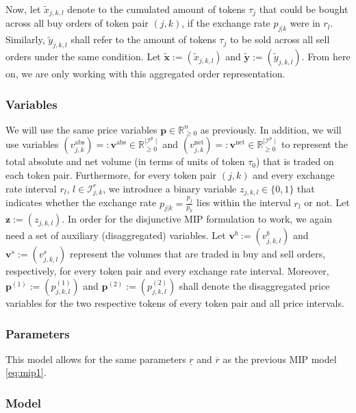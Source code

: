 \documentclass[11pt,parskip=full]{scrartcl}%
\newcommand*{\itokenpairs}{\mathcal{I}^p}   %
\begin{document}
Now, let $ \tilde{x}_{j,k,l} $ denote to the cumulated amount of tokens $ \tau_j $ that could be
bought across all buy orders of token pair $ (j,k) $, if the exchange rate $ p_{j|k} $ were in
$ r_l $.
Similarly, $ \tilde{y}_{j,k,l} $ shall refer to the amount of tokens $ \tau_j $ to be sold across
all sell orders under the same condition.
Let $ \tilde{\mathbf{x}} := (\tilde{x}_{j,k,l}) $ and
$ \tilde{\mathbf{y}} := (\tilde{y}_{j,k,l}) $.
From here on, we are only working with this aggregated order representation.


\subsubsection*{Variables}

We will use the same price variables $ \mathbf{p} \in \mathbb{R}^n_{\ge 0} $ as previously.
In addition, we will use variables $ (v_{j,k}^\mathrm{abs}) =: \mathbf{v}^\mathrm{abs} \in
\mathbb{R}_{\ge 0}^{\mid \itokenpairs \mid} $ and
$ (v_{j,k}^\mathrm{net}) =: \mathbf{v}^\mathrm{net} \in \mathbb{R}_{\ge 0}^{\mid \itokenpairs \mid}
$ to represent the total absolute and net volume (in terms of units of token $ \tau_0 $) that is
traded on each token pair.
Furthermore, for every token pair $ (j,k) $ and every exchange rate interval $ r_l $,
$ l \in \mathcal{I}_{j,k}^r $, we introduce a binary variable $ z_{j,k,l} \in \{0,1\} $ that
indicates whether the exchange rate $ p_{j|k} = \frac{p_j}{p_k} $ lies within the interval $ r_l $
or not.
Let $ \mathbf{z} := (z_{j,k,l}) $.
In order for the disjunctive MIP formulation to work, we again need a set of auxiliary
(disaggregated) variables.
Let $ \mathbf{v}^b := (v^b_{j,k,l}) $ and $ \mathbf{v}^s := (v^s_{j,k,l}) $ represent the volumes
that are traded in buy and sell orders, respectively, for every token pair and every exchange rate
interval.
Moreover, $ \mathbf{p}^{(1)} := (p^{(1)}_{j,k,l}) $ and $ \mathbf{p}^{(2)} := (p^{(2)}_{j,k,l}) $
shall denote the disaggregated price variables for the two respective tokens of every token pair
and all price intervals.


\subsubsection*{Parameters}

This model allows for the same parameters $ \underline{r} $ and $ \overline{r} $ as the previous
MIP model \eqref{eq:mip1}.


\subsubsection*{Model}
\end{document}
